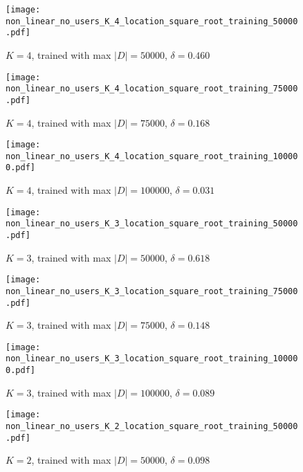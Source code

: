\documentclass{acm_proc_article-sp}
\theoremstyle{plain}
\theoremstyle{plain}
\theoremstyle{plain}
\theoremstyle{plain}
\theoremstyle{plain}
\theoremstyle{plain}
\begin{document}
\begin{figure*}[!t]
        \centering
        \begin{subfigure}[]{0.3\textwidth}
                \texttt{[image: non\_linear\_no\_users\_K\_4\_location\_square\_root\_training\_50000.pdf]}
                \caption{$K=4$, trained with max $|D|=50000$, $\delta = 0.460$}
                \label{fig:K_4_loc_50000}
        \end{subfigure}
    \begin{subfigure}[]{0.3\textwidth}
                \texttt{[image: non\_linear\_no\_users\_K\_4\_location\_square\_root\_training\_75000.pdf]}
                \caption{$K=4$, trained with max $|D|=75000$, $\delta = 0.168$}
                \label{fig:K_4_loc_75000}
        \end{subfigure}   
    \begin{subfigure}[]{0.3\textwidth}
                \texttt{[image: non\_linear\_no\_users\_K\_4\_location\_square\_root\_training\_100000.pdf]}
                \caption{$K=4$, trained with max $|D|=100000$, $\delta = 0.031$}
                \label{fig:K_4_loc_100000}
        \end{subfigure}
    \begin{subfigure}[]{0.3\textwidth}
                \texttt{[image: non\_linear\_no\_users\_K\_3\_location\_square\_root\_training\_50000.pdf]}
                \caption{$K=3$, trained with max $|D|=50000$, $\delta = 0.618$}
                \label{fig:K_3_loc_50000}
        \end{subfigure}
    \begin{subfigure}[]{0.3\textwidth}
                \texttt{[image: non\_linear\_no\_users\_K\_3\_location\_square\_root\_training\_75000.pdf]}
                \caption{$K=3$, trained with max $|D|=75000$, $\delta = 0.148$}
                \label{fig:K_3_loc_75000}
        \end{subfigure}
    \begin{subfigure}[]{0.3\textwidth}
                \texttt{[image: non\_linear\_no\_users\_K\_3\_location\_square\_root\_training\_100000.pdf]}
                \caption{$K=3$, trained with max $|D|=100000$, $\delta = 0.089$}
                \label{fig:K_3_loc_100000}
        \end{subfigure}
    \begin{subfigure}[]{0.3\textwidth}
                \texttt{[image: non\_linear\_no\_users\_K\_2\_location\_square\_root\_training\_50000.pdf]}
                \caption{$K=2$, trained with max $|D|=50000$, $\delta = 0.098$}

\end{subfigure}
\end{figure*}
\end{document}
